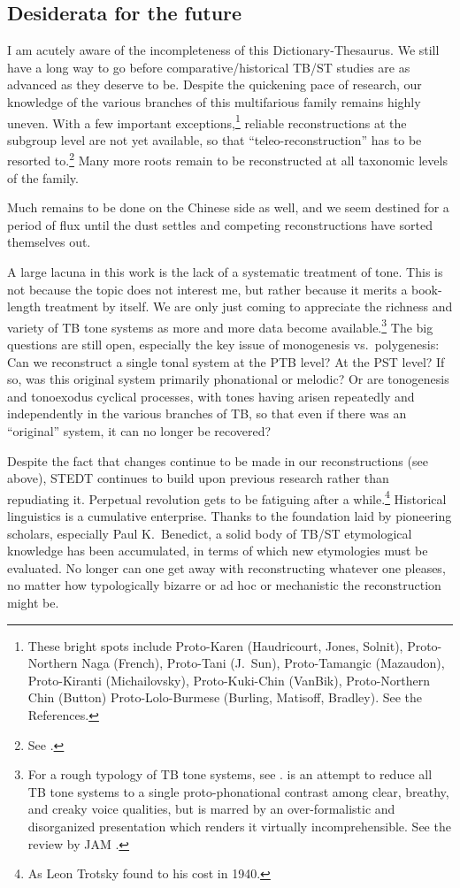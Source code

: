 \subsection{Desiderata for the future}

I am acutely aware of the incompleteness of this Dictionary-Thesaurus. We still have a long way to go before comparative/historical TB/ST studies are as advanced as they deserve to be. Despite the quickening pace of research, our knowledge of the various branches of this multifarious family remains highly uneven. With a few important exceptions,\footnote{These bright spots include Proto-Karen (Haudricourt, Jones, Solnit), Proto-Northern Naga (French), Proto-Tani (J.\ Sun), Proto-Tamangic (Mazaudon), Proto-Kiranti (Michailovsky), Proto-Kuki-Chin (VanBik), Proto-Northern Chin (Button) Proto-Lolo-Burmese (Burling, Matisoff, Bradley). See the References.} reliable reconstructions at the subgroup level are not yet available, so that “teleo-reconstruction” has to be resorted to.\footnote{See \citealt{PKB-TBT}.} Many more roots remain to be reconstructed at all taxonomic levels of the family.

Much remains to be done on the Chinese side as well, and we seem destined for a period of flux until the dust settles and competing reconstructions have sorted themselves out.

A large lacuna in this work is the lack of a systematic treatment of tone. This is not because the topic does not interest me, but rather because it merits a book-length treatment by itself. We are only just coming to appreciate the richness and variety of TB tone systems as more and more data become available.\footnote{For a rough typology of TB tone systems, see \citealt{JAM-TBT}. \citealt{AW-TBT}is an attempt to reduce all TB tone systems to a single proto-phonational contrast among clear, breathy, and creaky voice qualities, but is marred by an over-formalistic and disorganized presentation which renders it virtually incomprehensible. See the review by JAM \citeyearpar{JAM-PP}.} The big questions are still open, especially the key issue of monogenesis vs.\ polygenesis: Can we reconstruct a single tonal system at the PTB level? At the PST level? If so, was this original system primarily phonational or melodic? Or are tonogenesis and tonoexodus cyclical processes, with tones having arisen repeatedly and independently in the various branches of TB, so that even if there was an “original” system, it can no longer be recovered?

Despite the fact that changes continue to be made in our reconstructions (see above), STEDT continues to build upon previous research rather than repudiating it. 
Perpetual revolution gets to be fatiguing after a while.\footnote{As Leon Trotsky found to his cost in 1940.} Historical linguistics is a cumulative enterprise. Thanks to the foundation laid by pioneering scholars, especially Paul K.\ Benedict, a solid body of TB/ST etymological knowledge has been accumulated, in terms of which new etymologies must be evaluated. No longer can one get away with reconstructing whatever one pleases, no matter how typologically bizarre or ad hoc or mechanistic the reconstruction might be.

